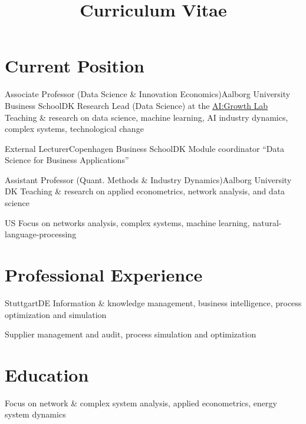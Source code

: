 \documentclass[10pt,a4paper,sans]{moderncv}   %
\title{Curriculum Vitae}               %
\begin{document}
\maketitle

\section{Current Position}

 {Associate Professor (Data Science \& Innovation Economics)}{Aalborg University Business School}{}{DK}  
{Research Lead (Data Science) at the \href{https://www.business.aau.dk/research/ai-growth-lab/}{AI:Growth Lab} \\
Teaching \& research on data science, machine learning, AI industry dynamics, complex systems, technological change}

 {External Lecturer}{Copenhagen Business School}{}{DK}  
{Module coordinator \enquote{Data Science for Business Applications}}

	{Assistant Professor (Quant. Methods \& Industry Dynamics)}{Aalborg University} {}{DK}  
{Teaching \& research on applied econometrics, network analysis, and data science} 

 {}{US}  
{Focus on networks analysis, complex systems, machine learning, natural-language-processing}

\section{Professional Experience}

 {Stuttgart}{DE}  
{Information \& knowledge management, business intelligence, process optimization and simulation}

{Supplier management and audit, process simulation and optimization}

\section{Education}

{Focus on network \& complex system analysis, applied econometrics, energy system dynamics}
\end{document}

